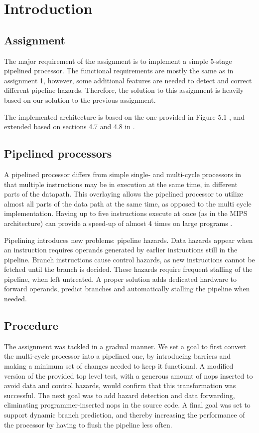 \chapter{Introduction}

\section{Assignment}
The major requirement of the assignment is to implement a simple 5-stage pipelined processor.
The functional requirements are mostly the same as in assignment 1\cite[p.44]{compendium}, however, some additional features are needed to detect and correct different pipeline hazards.
Therefore, the solution to this assignment is heavily based on our solution to the previous assignment\cite{report-1}.

The implemented architecture is based on the one provided in Figure 5.1 \cite[p.50]{compendium},
and extended based on sections 4.7 and 4.8 in \cite{thebook}.

\section{Pipelined processors}

A pipelined processor differs from simple single- and multi-cycle processors in that multiple instructions may be in execution at the same time, in different parts of the datapath.
This overlaying allows the pipelined processor to utilize almost all parts of the data path at the same time, as opposed to the multi cycle implementation.
Having up to five instructions execute at once (as in the MIPS architecture) can provide a speed-up of almost 4 times on large programs \cite[p.276]{thebook}.

Pipelining introduces new problems: pipeline hazards.
Data hazards appear when an instruction requires operands generated by earlier instructions still in the pipeline.
Branch instructions cause control hazards, as new instructions cannot be fetched until the branch is decided.
These hazards require frequent stalling of the pipeline, when left untreated.
A proper solution adds dedicated hardware to forward operands, predict branches and automatically stalling the pipeline when needed.

\section{Procedure}

The assignment was tackled in a gradual manner.
We set a goal to first convert the multi-cycle processor into a pipelined one, by introducing barriers and making a minimum set of changes needed to keep it functional.
A modified version of the provided top level test, with a generous amount of nops inserted to avoid data and control hazards, would confirm that this transformation was successful.
The next goal was to add hazard detection and data forwarding, eliminating programmer-inserted nops in the source code.
A final goal was set to support dynamic branch prediction, and thereby increasing the performance of the processor by having to flush the pipeline less often.
